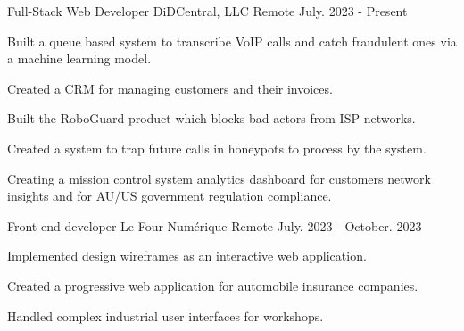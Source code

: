 

\begin{cventries}
  \cventry
    {Full-Stack Web Developer} %
    {DiDCentral, LLC} %
    {Remote} %
    {July. 2023 - Present} %
    {
      \begin{cvitems} %
        \item {Built a queue based system to transcribe VoIP calls and catch fraudulent ones via a machine learning model.}
        \item {Created a CRM for managing customers and their invoices.}
        \item {Built the RoboGuard product which blocks bad actors from ISP networks.}
        \item {Created a system to trap future calls in honeypots to process by the system.}
        \item {Creating a mission control system analytics dashboard for customers network insights and for AU/US government regulation compliance.}
      \end{cvitems}
    }

  \cventry
    {Front-end developer} %
    {Le Four Numérique} %
    {Remote} %
    {July. 2023 - October. 2023} %
    {
      \begin{cvitems} %
        \item {Implemented design wireframes as an interactive web application.}
        \item {Created a progressive web application for automobile insurance companies.}
        \item {Handled complex industrial user interfaces for workshops.}
      \end{cvitems}
    }


\end{cventries}
